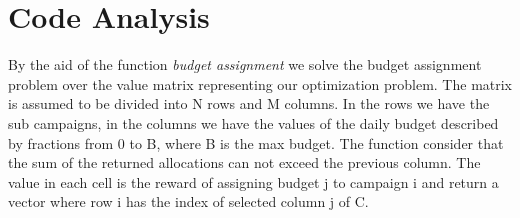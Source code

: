 \section{Code Analysis}
\label{sec:Opt_Code Analysis}

By the aid of the function \textit{budget assignment} we solve the budget assignment problem over the value matrix representing our optimization problem. The matrix is assumed to be divided into N rows and M columns. In the rows we have the sub campaigns, in the columns we have the values of the daily budget described by fractions from 0 to B, where B is the max budget. The function consider that the sum of the returned allocations can not exceed the previous column. The value in each cell is the reward of assigning budget j to campaign i and return a vector where row i has the index of selected column j of C.
